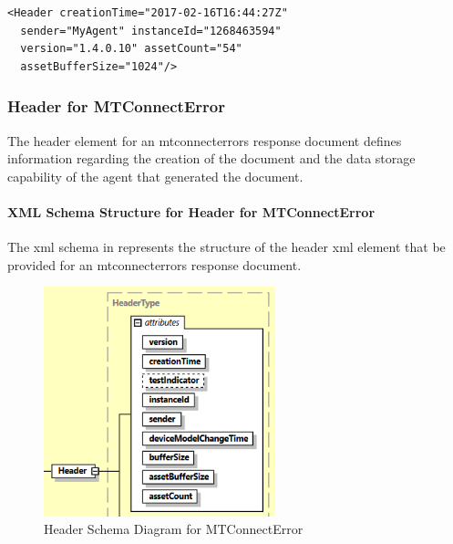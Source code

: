 \begin{lstlisting}[firstnumber=1,escapechar=|,%
caption={Example of Header XML Element for MTConnectAssets}, label={lst:header-xml-element-for-mtconnectassets}]
<Header creationTime="2017-02-16T16:44:27Z"
  sender="MyAgent" instanceId="1268463594"
  version="1.4.0.10" assetCount="54"
  assetBufferSize="1024"/>
\end{lstlisting}

\subsubsection{Header for MTConnectError}
\label{sec:Header for MTConnectError}

The \gls{header} element for an \gls{mtconnecterrors response document} defines information regarding the creation of the document and the data storage capability of the \gls{agent} that generated the document.  

\paragraph{XML Schema Structure for Header for MTConnectError}\mbox{}

The \gls{xml schema} in  represents the structure of the \gls{header} \gls{xml} element that \MUST be provided for an \gls{mtconnecterrors response document}.  

\begin{figure}[ht]
  \centering
  \includegraphics[width=0.6\textwidth]{figures/header-schema-diagram-for-mtconnecterror.png}
  \caption{Header Schema Diagram for MTConnectError}
  \label{fig:header-schema-diagram-for-mtconnecterror}
\end{figure}

